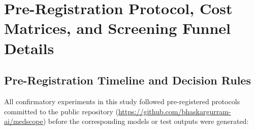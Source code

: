 \documentclass[5p,times,twocolumn,authoryear]{elsarticle}
\begin{document}



\newpage
\onecolumn
\appendix

\section{Pre-Registration Protocol, Cost Matrices, and Screening Funnel Details}
\label{app:prereg_and_funnel}

\subsection{Pre-Registration Timeline and Decision Rules}
All confirmatory experiments in this study followed pre-registered protocols committed to the public repository (\url{https://github.com/bhaskargurram-ai/medscope}) before the corresponding models or test outputs were generated:
\end{document}

